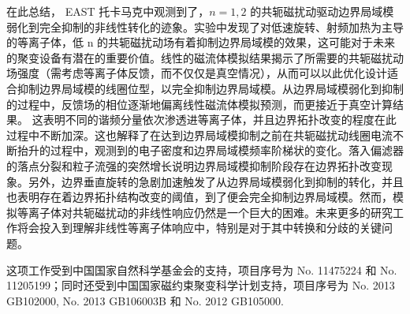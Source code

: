 
在此总结， EAST 托卡马克中观测到了，$n=1,2$ 的共轭磁扰动驱动边界局域模弱化到完全抑制的非线性转化的迹象。实验中发现了对低速旋转、射频加热为主导的等离子体，低 n 的共轭磁扰动场有着抑制边界局域模的效果，这可能对于未来的聚变设备有潜在的重要价值。线性的磁流体模拟结果揭示了所需要的共轭磁扰动场强度（需考虑等离子体反馈，而不仅仅是真空情况），从而可以以此优化设计适合抑制边界局域模的线圈位型，以完全抑制边界局域模。从边界局域模弱化到抑制的过程中，反馈场的相位逐渐地偏离线性磁流体模拟预测，而更接近于真空计算结果。
这表明不同的谐频分量依次渗透进等离子体，并且边界拓扑改变的程度在此过程中不断加深。这也解释了在达到边界局域模抑制之前在共轭磁扰动线圈电流不断抬升的过程中，观测到的电子密度和边界局域模频率阶梯状的变化。落入偏滤器的落点分裂和粒子流强的突然增长说明边界局域模抑制阶段存在边界拓扑改变现象。另外，边界垂直旋转的急剧加速触发了从边界局域模弱化到抑制的转化，并且也表明存在着边界拓扑结构改变的阈值，到了便会完全抑制边界局域模。然而，模拟等离子体对共轭磁扰动的非线性响应仍然是一个巨大的困难。未来更多的研究工作将会投入到理解非线性等离子体响应中，特别是对于其中转换和分歧的关键问题。

这项工作受到中国国家自然科学基金会的支持，项目序号为 No. 11475224 和 No. 11205199；同时还受到中国国家磁约束聚变科学计划支持，项目序号为 No. 2013 GB102000, No. 2013 GB106003B 和 No. 2012 GB105000.

